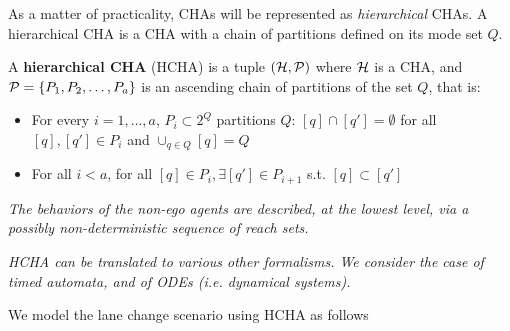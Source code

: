As a matter of practicality, CHAs will be represented as \emph{hierarchical} CHAs. 
A hierarchical CHA is a CHA with a chain of partitions defined on its mode set $Q$.
\begin{defn}
	A \textbf{hierarchical CHA} (HCHA) is a tuple $(\mathcal{H}, \mathcal{P})$ where $\mathcal{H}$ is a CHA, and $\mathcal{P} = \{P_1,P_2,\ldots,P_a\}$ is an ascending chain of partitions of the set $Q$, that is:
	\begin{itemize}
		\item For every $i =1,\ldots,a$, $P_i \subset 2^Q$ partitions $Q$: $[q] \cap [q'] = \emptyset$ for all $[q],[q'] \in P_i$ and $\cup_{q\in Q}[q] = Q$
		\item For all $i<a$, for all $[q]\in P_i, \exists [q'] \in P_{i+1}$ s.t. $[q] \subset [q']$ 
	\end{itemize}
\end{defn}

{\it The behaviors of the non-ego agents are described, at the lowest level, via a possibly non-deterministic sequence of reach sets.}

{\it HCHA can be translated to various other formalisms. We consider the case of timed automata, and of ODEs (i.e. dynamical systems).}

\begin{exmp}
	We model the lane change scenario using HCHA as follows
	\end{exmp}
